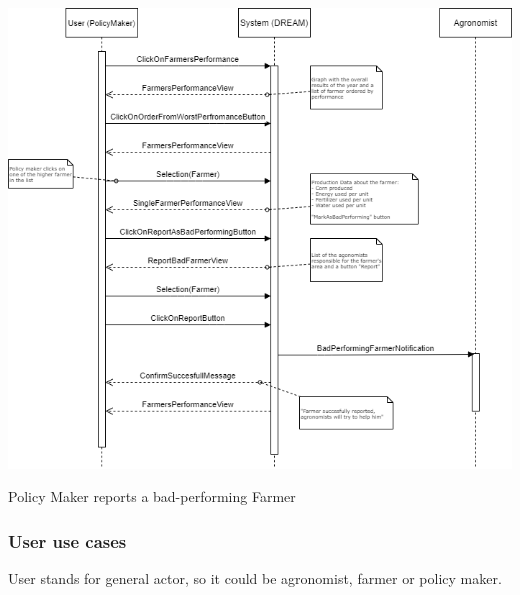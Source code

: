\documentclass{article}
\begin{document}
\begin{center}
    \includegraphics[width=1.0\textwidth]{images/sequenceDiagrams/23. PolicyMakerReportBadFarmers.png}
    \par
    \caption{\label{fig:frog}Policy Maker reports a bad-performing Farmer}

    \newpage
    
    

    
\end{center}




\subsubsection{User use cases}

User stands for general actor, so it could be agronomist, farmer or policy maker.
\end{document}
